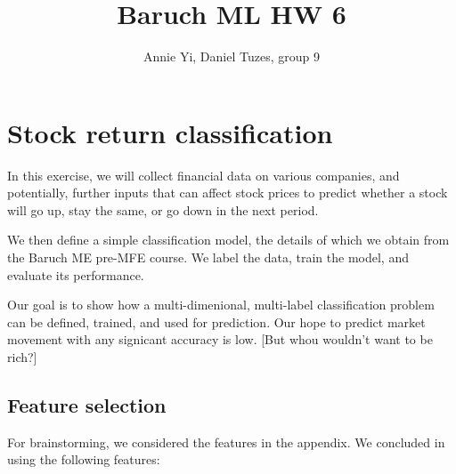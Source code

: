 \documentclass{article}
\title{Baruch ML HW 6}
\author{Annie Yi, Daniel Tuzes, group 9}
\begin{document}
\maketitle

\tableofcontents

\section*{Stock return classification}
In this exercise, we will collect financial data on various companies,
and potentially, further inputs that can affect stock prices to predict
whether a stock will go up, stay the same, or go down in the next period.

We then define a simple classification model,
the details of which we obtain from the Baruch ME pre-MFE course.
We label the data, train the model, and evaluate its performance.

Our goal is to show how a multi-dimenional,
multi-label classification problem
can be defined, trained, and used for prediction. Our hope to predict
market movement with any signicant accuracy is low.
    [But whou wouldn't want to be rich?]

\subsection*{Feature selection}
For brainstorming, we considered the features in the appendix.
We concluded in using the following features:
\end{document}
